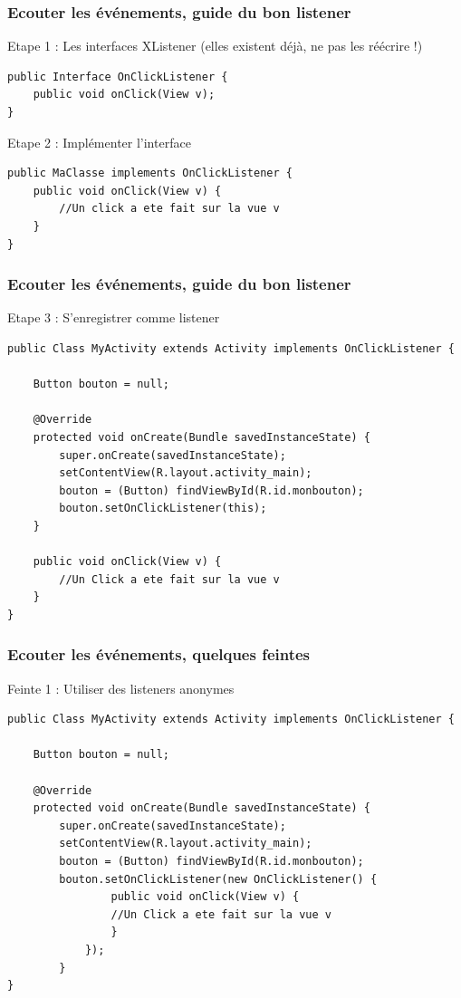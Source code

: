 \documentclass{beamer}
\begin{document}
\begin{frame}[fragile]
\frametitle{Ecouter les événements, guide du bon listener}
Etape 1 : Les interfaces XListener (elles existent déjà, ne pas les réécrire !)
\begin{lstlisting}
public Interface OnClickListener {
    public void onClick(View v);
}
\end{lstlisting}
Etape 2 : Implémenter l'interface
\begin{lstlisting}
public MaClasse implements OnClickListener {
    public void onClick(View v) {
        //Un click a ete fait sur la vue v
    }
}
\end{lstlisting}
\end{frame}
\begin{frame}[fragile]
\frametitle{Ecouter les événements, guide du bon listener}
Etape 3 : S'enregistrer comme listener
\begin{lstlisting}
public Class MyActivity extends Activity implements OnClickListener {

    Button bouton = null;

    @Override
    protected void onCreate(Bundle savedInstanceState) {
        super.onCreate(savedInstanceState);
        setContentView(R.layout.activity_main);
        bouton = (Button) findViewById(R.id.monbouton);
        bouton.setOnClickListener(this);
    }
	
    public void onClick(View v) {
        //Un Click a ete fait sur la vue v
    }
}
\end{lstlisting}
\end{frame}
\begin{frame}[fragile]
\frametitle{Ecouter les événements, quelques feintes}
Feinte 1 : Utiliser des listeners anonymes
\begin{lstlisting}
public Class MyActivity extends Activity implements OnClickListener {

    Button bouton = null;

    @Override
    protected void onCreate(Bundle savedInstanceState) {
        super.onCreate(savedInstanceState);
        setContentView(R.layout.activity_main);
        bouton = (Button) findViewById(R.id.monbouton);
        bouton.setOnClickListener(new OnClickListener() {
                public void onClick(View v) {
                //Un Click a ete fait sur la vue v
                }
            });
	    }
}
\end{lstlisting}
\end{frame}
\end{document}
